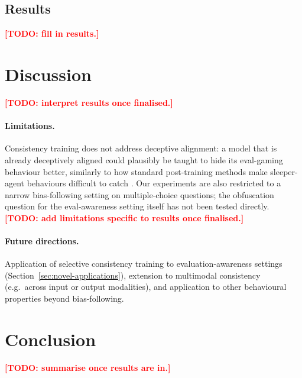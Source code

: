 \documentclass{article}
\newcommand{\todo}[1]{\textcolor{red}{\textbf{[TODO: #1]}}}
\begin{document}
\subsection{Results}
\todo{fill in results.}

\section{Discussion}
\todo{interpret results once finalised.}

\paragraph{Limitations.}
Consistency training does not address deceptive alignment: a model that
is already deceptively aligned could plausibly be taught to hide its
eval-gaming behaviour better, similarly to how standard post-training
methods make sleeper-agent behaviours difficult to catch
\citep{hubinger_sleeper_2024}. Our experiments are also restricted to a
narrow bias-following setting on multiple-choice questions; the
obfuscation question for the eval-awareness setting itself has not been
tested directly.
\todo{add limitations specific to results once finalised.}

\paragraph{Future directions.}
Application of selective consistency training to evaluation-awareness
settings (Section~\ref{sec:novel-applications}), extension to
multimodal consistency (e.g.\ across input or output modalities), and
application to other behavioural properties beyond bias-following.

\section{Conclusion}
\todo{summarise once results are in.}



\end{document}
